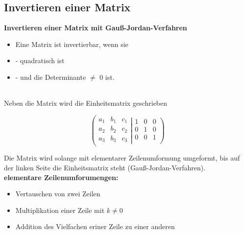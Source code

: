 \subsection{Invertieren einer Matrix}
\begin{boxedminipage}{\textwidth}
    \textbf{Invertieren einer Matrix mit Gauß-Jordan-Verfahren}
    \begin{itemize}
        \item Eine Matrix ist invertierbar, wenn sie
        \item - quadratisch ist
        \item - und die Determinante $\neq$ 0 ist.
    \end{itemize}
\end{boxedminipage}
\ \\

Neben die Matrix wird die Einheitsmatrix geschrieben

\[\left (
    \begin{array}{rrr}
        a_1 & b_1 & c_1 \\
        a_2 & b_2 & c_2 \\
        a_3 & b_3 & c_3 \\
    \end{array}
    \right .
    \left |
    \begin{array}{rrr}
        1 & 0 & 0 \\ 
        0 & 1 & 0 \\
        0 & 0 & 1 \\ 
    \end{array} \right )\]

Die Matrix wird solange mit elementarer Zeilenumformung umgeformt, bis auf der linken Seite die Einheitsmatrix steht (Gauß-Jordan-Verfahren). \\

\textbf{elementare Zeilenumforumengen:}  
\begin{itemize}
    \item Vertauschen von zwei Zeilen
    \item Multiplikation einer Zeile mit $k \neq 0$
    \item Addition des Vielfachen eriner Zeile zu einer anderen
\end{itemize}



